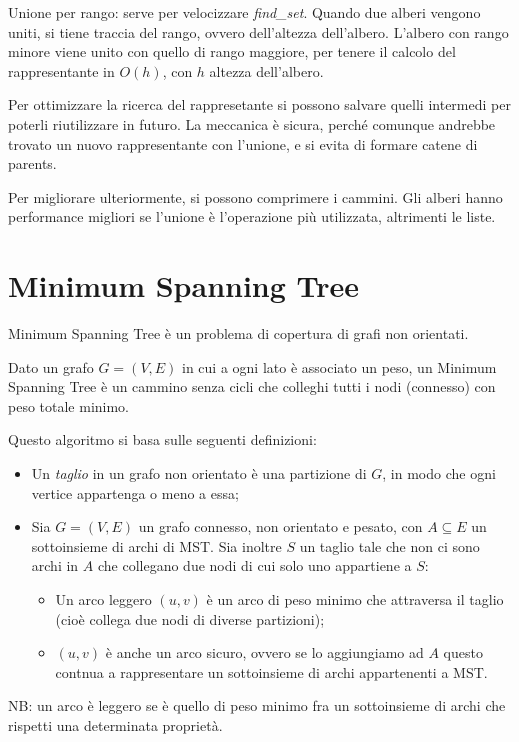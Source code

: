Unione per rango: serve per velocizzare \textit{find\_set}. Quando due alberi vengono uniti, si tiene traccia del rango, ovvero dell'altezza dell'albero. L'albero con rango minore viene unito con quello di rango maggiore, per tenere il calcolo del rappresentante in $O(h)$, con $h$ altezza dell'albero.

Per ottimizzare la ricerca del rappresetante si possono salvare quelli intermedi per poterli riutilizzare in futuro. La meccanica è sicura, perché comunque andrebbe trovato un nuovo rappresentante con l'unione, e si evita di formare catene di parents.

Per migliorare ulteriormente, si possono comprimere i cammini. Gli alberi hanno performance migliori se l'unione è l'operazione più utilizzata, altrimenti le liste.

\section{Minimum Spanning Tree}
Minimum Spanning Tree è un problema di copertura di grafi non orientati.

Dato un grafo $G = (V, E)$ in cui a ogni lato è associato un peso, un Minimum Spanning Tree è un cammino senza cicli che colleghi tutti i nodi (connesso) con peso totale minimo. 

Questo algoritmo si basa sulle seguenti definizioni:
\begin{itemize}
	\item Un \textit{taglio} in un grafo non orientato è una partizione di $G$, in modo che ogni vertice appartenga o meno a essa;
	\item Sia $G = (V, E)$ un grafo connesso, non orientato e pesato, con $A \subseteq E$ un sottoinsieme di archi di MST. Sia inoltre $S$ un taglio tale che non ci sono archi in $A$ che collegano due nodi di cui solo uno appartiene a $S$:
	\begin{itemize}
		\item Un arco leggero $(u, v)$ è un arco di peso minimo che attraversa il taglio (cioè collega due nodi di diverse partizioni);
		\item $(u, v)$ è anche un arco sicuro, ovvero se lo aggiungiamo ad $A$ questo contnua a rappresentare un sottoinsieme di archi appartenenti a MST.
	\end{itemize}
\end{itemize}

NB: un arco è leggero se è quello di peso minimo fra un sottoinsieme di archi che rispetti una determinata proprietà.

